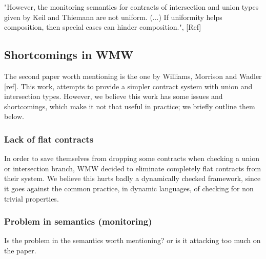 "However, the monitoring semantics for contracts of intersection and union types given by Keil
and Thiemann are not uniform. (...) If uniformity helps composition, then
special cases can hinder composition.", [Ref]

\subsection{Shortcomings in WMW}

The second paper worth mentioning is the one by Williams, Morrison and Wadler [ref].
This work, attempts to provide a simpler contract system with
union and intersection types.
However, we believe this work has some issues and shortcomings, which make it
not that useful in practice; we briefly outline them below.

\subsubsection*{Lack of flat contracts}

In order to save themselves from dropping some contracts when checking a union
or intersection branch, WMW decided to eliminate completely flat contracts from
their system.
We believe this hurts badly a dynamically checked framework, since it goes against
the common practice, in dynamic languages, of checking for non trivial properties.

\subsubsection*{Problem in semantics (monitoring)}
Is the problem in the semantics worth mentioning? or is it attacking too much on the paper.
